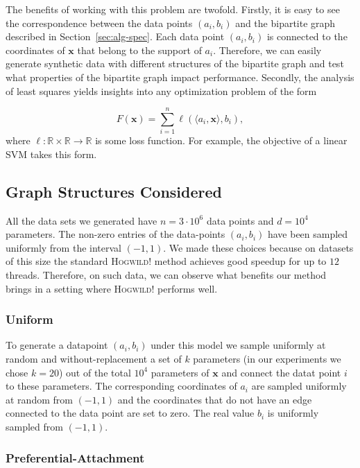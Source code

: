 \documentclass[times,11pt]{article}
\numberwithin{equation}{section}		%
\numberwithin{figure}{section}			%
\numberwithin{table}{section}				%
\newcommand{\xvec}{\mathbf{x}}
\newcommand{\HW}{\textsc{Hogwild!}}
\newcommand{\RR}{\mathbb{R}}
\begin{document}
The benefits of working with this problem are twofold. Firstly, it is easy to see the correspondence between the data points $(a_i, b_i)$ and the bipartite graph described in Section~\ref{sec:alg-spec}. Each data point $(a_i,b_i)$ is connected to the coordinates of $\xvec$ that belong to the support of $a_i$. Therefore, we can easily generate synthetic data with different structures of the bipartite graph and test what properties of the bipartite graph impact performance. Secondly, the analysis of least squares yields insights into any optimization problem of the form 

\begin{equation}
F(\xvec) = \sum_{i = 1}^n \ell (\langle a_i, \xvec\rangle, b_i),
\end{equation}
where $\ell \colon \RR \times \RR \rightarrow \RR$ is some loss function. For example, the objective of a linear SVM takes this form. 


\subsection{Graph Structures Considered}

All the data sets we generated have $n = 3\cdot 10^6$ data points and $d = 10^4$ parameters. The non-zero entries of the data-points $(a_i, b_i)$ have been sampled uniformly from the interval $(-1,1)$.  We made these choices because on datasets of this size the standard \HW{} method achieves good speedup for up to $12$ threads. Therefore, on such data, we can observe what benefits our method brings in a setting where \HW{} performs well. 

\subsubsection*{Uniform}

To generate a datapoint $(a_i, b_i)$ under this model we sample uniformly at random and without-replacement a set of $k$ parameters (in our experiments we chose $k = 20$) out of the total $10^4$ parameters of $\xvec$ and connect the datat point $i$ to these parameters.  The corresponding coordinates of $a_i$ are sampled uniformly at random from $(-1,1)$ and the coordinates that do not have an edge connected to the data point are set to zero. The real value $b_i$ is uniformly sampled from $(-1,1)$. 

\subsubsection*{Preferential-Attachment}
\end{document}
